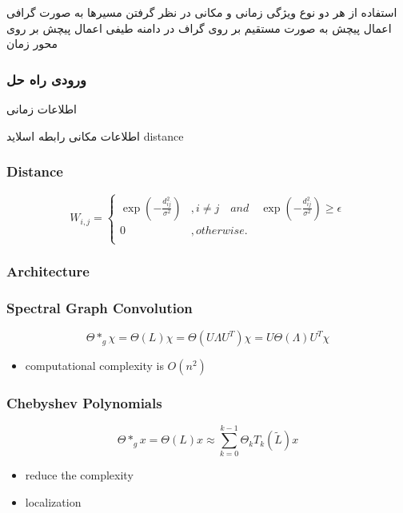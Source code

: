 \documentclass{beamer}
\begin{document}
\begin{persian}
\begin{frame}
   استفاده از هر دو نوع ویژگی زمانی و مکانی
   در نظر گرفتن مسیرها به صورت گرافی
   اعمال پیچش به صورت مستقیم بر روی گراف در دامنه طیفی
   اعمال پیچش بر روی محور زمان
\end{frame}

\begin{frame}
  \frametitle{ورودی راه حل}
\end{frame}
\begin{frame}
  اطلاعات زمانی
\end{frame}
\begin{frame}
  اطلاعات مکانی
  رابطه اسلاید distance
\end{frame}

\begin{frame}
  \frametitle{Distance}
  \begin{equation}
    W_{i,j} = \left\{
      \begin{array}{ll}
        \exp(-\frac{d^{2}_{ij}}{\sigma^{2}}) & , i \neq j \quad and \quad \exp(-\frac{d^{2}_{ij}}{\sigma^{2}}) \geq \epsilon \\
        0 & , otherwise. \\
      \end{array}\right.
    \label{eq:distance}
  \end{equation}
\end{frame}

\begin{frame}
  \frametitle{Architecture}
\end{frame}

\begin{frame}
\end{frame}

\begin{frame}
  \frametitle{Spectral Graph Convolution}
  \begin{equation}
    \Theta *_{g} \chi = \Theta(L)\chi = \Theta(U \Lambda U^{T})\chi = U\Theta(\Lambda)U^{T}\chi
    \label{eq:convolution}
  \end{equation}
  \begin{itemize}
    \item computational complexity is $O(n^{2})$
  \end{itemize}
\end{frame}

\begin{frame}
  \frametitle{Chebyshev Polynomials}
  \begin{equation}
    \Theta \ast_{g} x = \Theta(L)x \approx \sum_{k=0}^{k-1} \Theta_{k} T_{k}(\widetilde{L})x
    \label{eq:approx-convolution}
  \end{equation}
  \begin{itemize}
    \item reduce the complexity
    \item localization
  \end{itemize}
\end{frame}


\end{persian}
\end{document}
